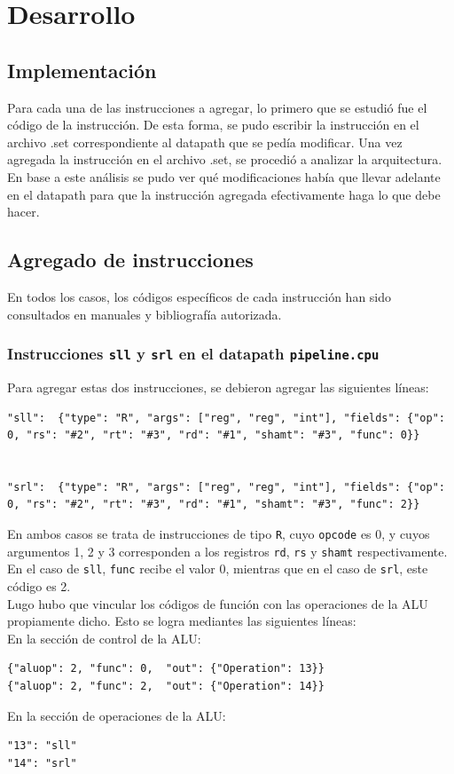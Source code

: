 \documentclass[a4paper,10pt]{article}
\begin{document}
\section{Desarrollo}

\subsection{Implementación}
Para cada una de las instrucciones a agregar, lo primero que se estudió fue el código de la instrucción. De esta forma, se pudo escribir la instrucción en el archivo .set correspondiente al datapath que se pedía modificar. Una vez agregada la instrucción en el archivo .set, se procedió a analizar la arquitectura. En base a este análisis se pudo ver qué modificaciones había que llevar adelante en el datapath para que la instrucción agregada efectivamente haga lo que debe hacer.

\subsection{Agregado de instrucciones}
En todos los casos, los códigos específicos de cada instrucción han sido consultados en manuales y bibliografía autorizada. 
\subsubsection{Instrucciones \texttt{sll} y \texttt{srl} en el datapath \texttt{pipeline.cpu}}
Para agregar estas dos instrucciones, se debieron agregar las siguientes líneas: 
\begin{lstlisting}[breaklines=true]
"sll":  {"type": "R", "args": ["reg", "reg", "int"], "fields": {"op": 0, "rs": "#2", "rt": "#3", "rd": "#1", "shamt": "#3", "func": 0}}


"srl":  {"type": "R", "args": ["reg", "reg", "int"], "fields": {"op": 0, "rs": "#2", "rt": "#3", "rd": "#1", "shamt": "#3", "func": 2}}
\end{lstlisting}
En ambos casos se trata de instrucciones de tipo \texttt{R}, cuyo \texttt{opcode} es 0, y cuyos argumentos 1, 2 y 3 corresponden a los registros \texttt{rd}, \texttt{rs} y \texttt{shamt} respectivamente. En el caso de \texttt{sll}, \texttt{func} recibe el valor 0, mientras que en el caso de \texttt{srl}, este código es 2. \\
Lugo hubo que vincular los códigos de función con las operaciones de la ALU propiamente dicho. Esto se logra mediantes las siguientes líneas:\\
En la sección de control de la ALU:
\begin{lstlisting}
{"aluop": 2, "func": 0,  "out": {"Operation": 13}}
{"aluop": 2, "func": 2,  "out": {"Operation": 14}}
\end{lstlisting}
En la sección de operaciones de la ALU:
\begin{lstlisting}
"13": "sll"
"14": "srl"
\end{lstlisting}
\end{document}
